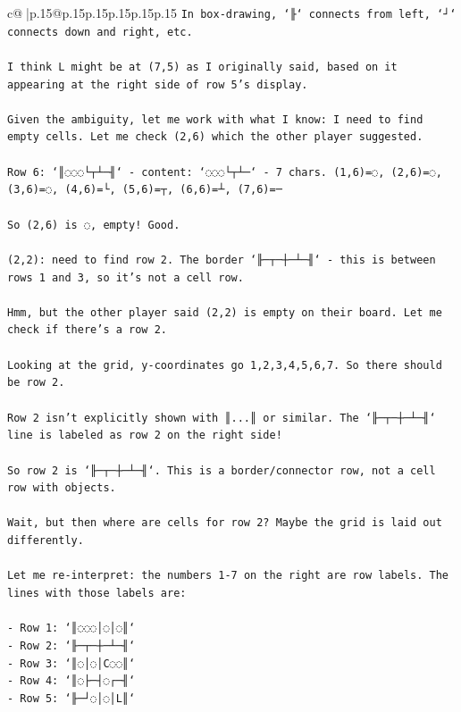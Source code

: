 \documentclass{article}
\begin{document}
{\begin{supertabular}{c@{$\;$}|p{.15\linewidth}@{}p{.15\linewidth}p{.15\linewidth}p{.15\linewidth}p{.15\linewidth}p{.15\linewidth}}
{{{\texttt{In box{-}drawing, `╟` connects from left, `┘` connects down and right, etc.} \\
\\ 
\texttt{I think L might be at (7,5) as I originally said, based on it appearing at the right side of row 5's display.} \\
\\ 
\texttt{Given the ambiguity, let me work with what I know: I need to find empty cells. Let me check (2,6) which the other player suggested.} \\
\\ 
\texttt{Row 6: `║◌◌◌└┬┴─╢` {-} content: `◌◌◌└┬┴─` {-} 7 chars. (1,6)=◌, (2,6)=◌, (3,6)=◌, (4,6)=└, (5,6)=┬, (6,6)=┴, (7,6)=─} \\
\\ 
\texttt{So (2,6) is ◌, empty! Good.} \\
\\ 
\texttt{(2,2): need to find row 2. The border `╟─┬─┼─┴─╢` {-} this is between rows 1 and 3, so it's not a cell row.} \\
\\ 
\texttt{Hmm, but the other player said (2,2) is empty on their board. Let me check if there's a row 2.} \\
\\ 
\texttt{Looking at the grid, y{-}coordinates go 1,2,3,4,5,6,7. So there should be row 2.} \\
\\ 
\texttt{Row 2 isn't explicitly shown with ║...║ or similar. The `╟─┬─┼─┴─╢` line is labeled as row 2 on the right side!} \\
\\ 
\texttt{So row 2 is `╟─┬─┼─┴─╢`. This is a border/connector row, not a cell row with objects.} \\
\\ 
\texttt{Wait, but then where are cells for row 2? Maybe the grid is laid out differently.} \\
\\ 
\texttt{Let me re{-}interpret: the numbers 1{-}7 on the right are row labels. The lines with those labels are:} \\
\\ 
\texttt{{-} Row 1: `║◌◌◌│◌│◌║`} \\
\texttt{{-} Row 2: `╟─┬─┼─┴─╢` } \\
\texttt{{-} Row 3: `║◌│◌│C◌◌║`} \\
\texttt{{-} Row 4: `║◌├─┤◌┌─╢`} \\
\texttt{{-} Row 5: `╟─┘◌│◌│L║`} \\
}}}
\end{supertabular}}
\end{document}
